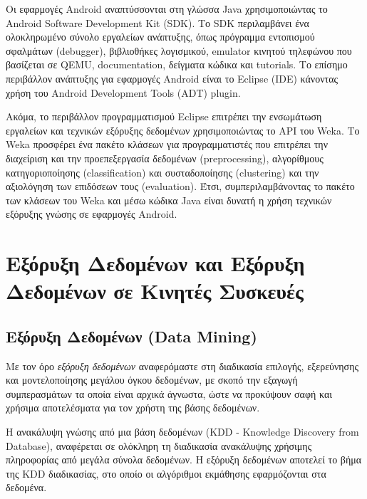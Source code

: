\documentclass[12pt,twoside,openright]{report}
\begin{document}
Οι εφαρμογές \lt Android \gt αναπτύσσονται στη γλώσσα \lt Java \gt χρησιμοποιώντας το \lt Android Software Development Kit (SDK). \gt Το \lt SDK \gt περιλαμβάνει ένα ολοκληρωμένο σύνολο εργαλείων ανάπτυξης, όπως πρόγραμμα εντοπισμού σφαλμάτων \lt(debugger), \gt βιβλιοθήκες λογισμικού, \lt emulator \gt κινητού τηλεφώνου που  βασίζεται σε \lt QEMU, documentation, \gt δείγματα κώδικα και \lt tutorials. \gt Το επίσημο περιβάλλον ανάπτυξης για εφαρμογές \lt Android \gt είναι το \lt Eclipse (IDE)  \gt κάνοντας χρήση του \lt Android Development Tools (ADT) plugin. \gt \cite{android}

Ακόμα, το περιβάλλον προγραμματισμού \lt Eclipse \gt επιτρέπει την ενσωμάτωση εργαλείων και τεχνικών εξόρυξης δεδομένων χρησιμοποιώντας το \lt API \gt του \lt Weka. \gt Το \lt Weka \gt προσφέρει ένα πακέτο κλάσεων για προγραμματιστές που επιτρέπει την διαχείριση και  την προεπεξεργασία  δεδομένων \lt (preprocessing), \gt αλγορίθμους κατηγοριοποίησης \lt (classification) \gt και συσταδοποίησης \lt (clustering) \gt και την αξιολόγηση των επιδόσεων τους \lt (evaluation). \gt Έτσι, συμπεριλαμβάνοντας το πακέτο των κλάσεων του \lt Weka \gt και μέσω κώδικα \lt Java \gt είναι δυνατή η χρήση τεχνικών εξόρυξης γνώσης σε εφαρμογές \lt Android.\gt  \cite{wekawithjava}  

\section[Εξόρυξη Δεδομένων και Εξόρυξη Δεδομένων σε Κινητές Συσκευές]{Εξόρυξη Δεδομένων και Εξόρυξη Δεδομένων σε Κινητές Συσκευές}
\subsection{Εξόρυξη Δεδομένων \lt (Data Mining)\gt}
Με τον όρο \emph{εξόρυξη δεδομένων} αναφερόμαστε στη διαδικασία επιλογής, εξερεύνησης και μοντελοποίησης μεγάλου όγκου δεδομένων, με σκοπό  την εξαγωγή συμπερασμάτων τα οποία είναι αρχικά άγνωστα, ώστε να προκύψουν σαφή και χρήσιμα αποτελέσματα για τον χρήστη της βάσης δεδομένων\cite{Giudici:2009}.

Η ανακάλυψη γνώσης από μια βάση δεδομένων \lt (KDD - Knowledge Discovery from Database)\gt, αναφέρεται σε ολόκληρη τη διαδικασία ανακάλυψης χρήσιμης πληροφορίας από μεγάλα σύνολα δεδομένων\cite{vazirgiannis2005halkidi}. Η εξόρυξη δεδομένων αποτελεί το βήμα της \lt KDD \gt διαδικασίας, στο οποίο οι αλγόριθμοι εκμάθησης εφαρμόζονται στα δεδομένα\cite{Giudici:2009}.
\end{document}
